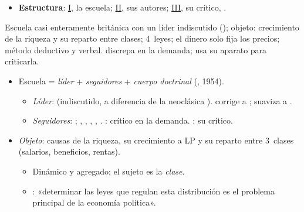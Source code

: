 \documentclass{article}
\begin{document}
\begin{columnas}
\begin{itemize}
\item \textbf{Estructura}: \hyperref[rep:I]{I}, la escuela; \hyperref[rep:II]{II}, sus autores; \hyperref[rep:III]{III}, su crítico, .
\end{itemize}

\begin{ideaclave}
Escuela casi enteramente británica con un líder indiscutido (); objeto: crecimiento de la riqueza y su reparto entre clases; 4~leyes; el dinero solo fija los precios; método deductivo y verbal.  discrepa en la demanda;  usa su aparato para criticarla.
\end{ideaclave}

\begin{itemize}
\item Escuela = \emph{líder} + \emph{seguidores} + \emph{cuerpo doctrinal} (, 1954).
  \begin{itemize}
  \item \emph{Líder}:  (indiscutido, a diferencia de la neoclásica ).  corrige a ;  suaviza a .
  \item \emph{Seguidores}: ; , , , , . : crítico en la demanda. : su crítico.
  \end{itemize}
\item \emph{Objeto}: causas de la riqueza, su crecimiento a LP y su reparto entre 3~clases (salarios, beneficios, rentas).
  \begin{itemize}
  \item Dinámico y agregado; el sujeto es la \emph{clase}.
  \item {}: «determinar las leyes que regulan esta distribución es el problema principal de la economía política».
  \end{itemize}
\end{itemize}


\end{columnas}
\end{document}
